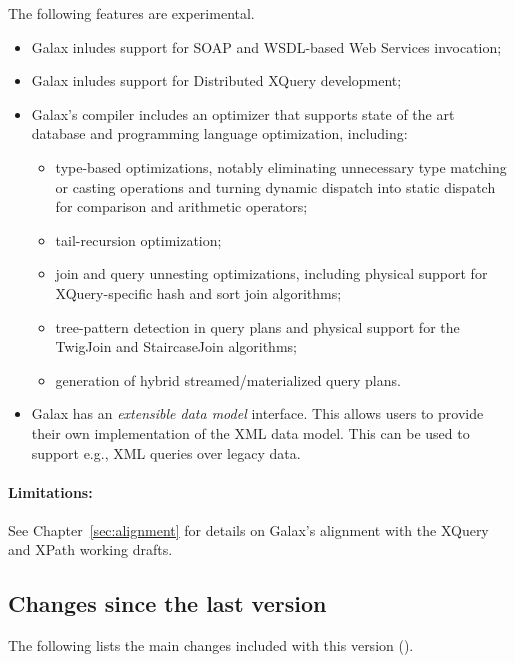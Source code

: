 The following features are experimental.

\begin{itemize}
\item Galax inludes support for SOAP and WSDL-based Web Services
  invocation;
\item Galax inludes support for Distributed XQuery development;
\item Galax's compiler includes an optimizer that supports state of
  the art database and programming language optimization, including:
  \begin{itemize}
  \item type-based optimizations, notably eliminating unnecessary type
    matching or casting operations and turning dynamic dispatch into
    static dispatch for comparison and arithmetic operators;
  \item tail-recursion optimization;
  \item join and query unnesting optimizations, including physical
    support for XQuery-specific hash and sort join algorithms;
  \item tree-pattern detection in query plans and physical support for
    the TwigJoin and StaircaseJoin algorithms;
  \item generation of hybrid streamed/materialized query plans.
  \end{itemize}
\item Galax has an \emph{extensible data model} interface. This allows
  users to provide their own implementation of the XML data
  model. This can be used to support e.g., XML queries over legacy
  data.
\end{itemize}

\paragraph{Limitations:} See Chapter~\ref{sec:alignment} for details
  on Galax's alignment with the XQuery and XPath working drafts.

\subsection{Changes since the last version}

The following lists the main changes included with this version
(\galaxversion).


